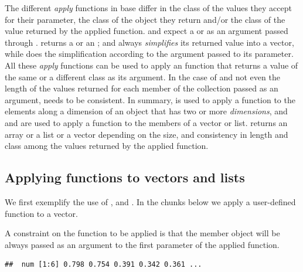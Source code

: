 \documentclass[krantz2]{krantz}\usepackage{knitr}
\begin{document}
The different \emph{apply} functions in base \Rlang differ in the class of the values they accept for their  parameter, the class of the object they return and/or the class of the value returned by the applied function.  and  expect a  or  as an argument passed through .  returns a  or an ; and  always \emph{simplifies} its returned value into a vector, while  does the simplification according to the argument passed to its  parameter. All these \emph{apply} functions can be used to apply an \Rlang function that returns a value of the same or a different class as its argument. In the case of  and  not even the length of the values returned for each member of the collection passed as an argument, needs to be consistent. In summary,  is used to apply a function to the elements along a dimension of an object that has two or more \emph{dimensions}, and  and  are used to apply a function to the members of a vector or list.  returns an array or a list or a vector depending on the size, and consistency in length and class among the values returned by the applied function.

\subsection{Applying functions to vectors and lists}

We first exemplify the use of ,  and . In the chunks below we apply a user-defined function to a vector.

\begin{warningbox}
A constraint on the function to be applied is that the member object will be always passed as an argument to the first parameter of the applied function.
\end{warningbox}

\begin{knitrout}\footnotesize
{}\color{fgcolor}\begin{kframe}
\begin{alltt}
\hlstd{(}\hlstd{)} 
 \hlkwb{<-} \hlstd{(}\hlstd{)} 
\end{alltt}
\begin{verbatim}
##  num [1:6] 0.798 0.754 0.391 0.342 0.361 ...
\end{verbatim}
\end{kframe}
\end{knitrout}
\end{document}
